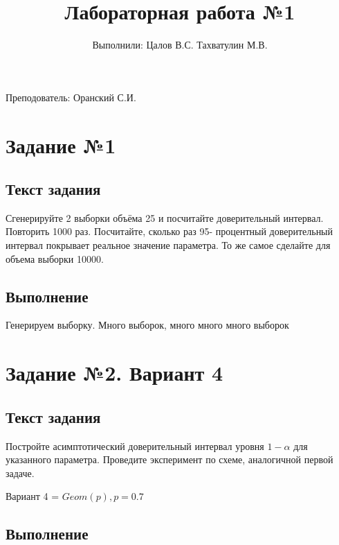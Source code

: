 \documentclass{article}
\title{Лабораторная работа №1}
\author{Выполнили: Цалов В.С. Тахватулин М.В.}
\begin{document}
\maketitle
\begin{center}
      {\fontsize{14}{15}\selectfont
            Преподователь: Оранский С.И.
      }
\end{center}


\section{Задание №1}\label{sec:-no1}
\subsection{Текст задания}
Сгенерируйте 2 выборки объёма 25 и посчитайте доверительный интервал. Повторить 1000 раз. Посчитайте, сколько раз 95-
процентный доверительный интервал покрывает реальное значение параметра. То же самое
сделайте для объема выборки 10000.

\subsection{Выполнение}
Генерируем выборку. 
Много выборок, много много много выборок

\section{Задание №2. Вариант 4}
\subsection{Текст задания}
Постройте асимптотический доверительный интервал уровня $1 - \alpha$ для указанного параметра. Проведите эксперимент по схеме, аналогичной первой задаче.

Вариант 4 = $Geom(p), p = 0.7$
\subsection{Выполнение}
\end{document}
